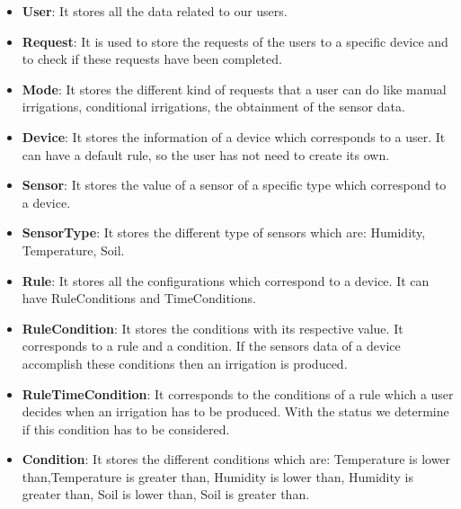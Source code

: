 \documentclass[11pt,a4paper]{article}
\begin{document}
\begin{itemize}
\item \textbf{User}: It stores all the data related to our users.

\item \textbf{Request}: It is used to store the requests of the users  to a specific device and to check if these requests have been completed. 

\item \textbf{Mode}: It stores the different kind of requests that a user can do  like manual irrigations, conditional irrigations, the obtainment of the sensor data.

\item \textbf{Device}: It stores the information of a device which corresponds to a user. It can have a default rule, so the user has not need to create its own. 

\item \textbf{Sensor}: It stores the value of a sensor of a specific type which correspond to a device.

\item \textbf{SensorType}: It stores the different type of sensors which are: Humidity, Temperature, Soil.

\item \textbf{Rule}: It stores all the configurations which correspond to a device. It can have RuleConditions and TimeConditions.

\item \textbf{RuleCondition}: It stores the conditions  with its respective value. It corresponds to a rule and a condition. If the sensors data of a device accomplish these conditions then an irrigation is produced.  

\item \textbf{RuleTimeCondition}: It corresponds to the conditions of a rule which a user decides when an irrigation has to be produced.  With the status we determine if this condition has to be considered.

\item \textbf{Condition}: It stores the different conditions which are: Temperature is lower than,Temperature is greater than, Humidity is lower than,  Humidity is greater than, Soil is lower than, Soil is greater than.
\end{itemize}

\newpage
\end{document}
